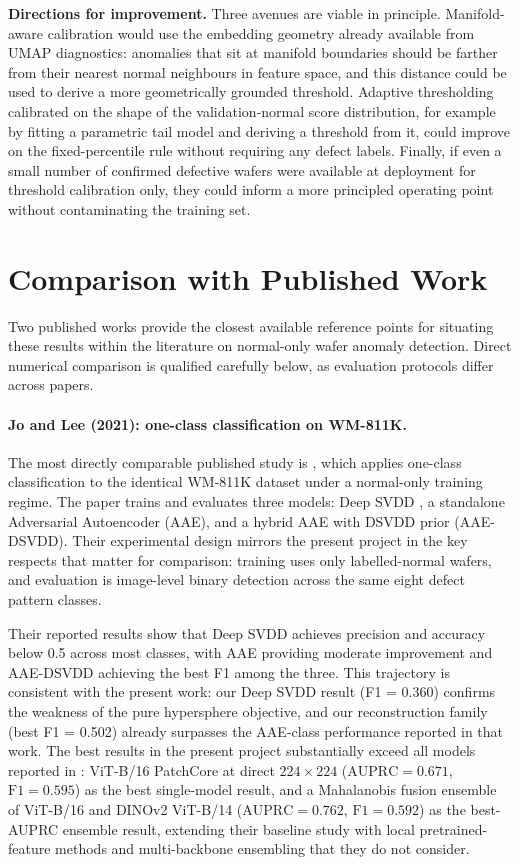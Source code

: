 \documentclass[11pt]{article}
\begin{document}
\textbf{Directions for improvement.} Three avenues are viable in principle. Manifold-aware calibration would use the embedding geometry already available from UMAP diagnostics: anomalies that sit at manifold boundaries should be farther from their nearest normal neighbours in feature space, and this distance could be used to derive a more geometrically grounded threshold. Adaptive thresholding calibrated on the shape of the validation-normal score distribution, for example by fitting a parametric tail model and deriving a threshold from it, could improve on the fixed-percentile rule without requiring any defect labels. Finally, if even a small number of confirmed defective wafers were available at deployment for threshold calibration only, they could inform a more principled operating point without contaminating the training set.

\section{Comparison with Published Work}

Two published works provide the closest available reference points for
situating these results within the literature on normal-only wafer anomaly
detection. Direct numerical comparison is qualified carefully below, as
evaluation protocols differ across papers.

\paragraph{Jo and Lee (2021): one-class classification on WM-811K.}
The most directly comparable published study is \cite{jo2021oneclass},
which applies one-class classification to the identical WM-811K dataset
under a normal-only training regime. The paper trains and evaluates three
models: Deep SVDD \cite{ruff2018deepsvdd}, a standalone Adversarial
Autoencoder (AAE), and a hybrid AAE with DSVDD prior (AAE-DSVDD). Their
experimental design mirrors the present project in the key respects that
matter for comparison: training uses only labelled-normal wafers, and
evaluation is image-level binary detection across the same eight defect
pattern classes.

Their reported results show that Deep SVDD achieves precision and accuracy
below 0.5 across most classes, with AAE providing moderate improvement and
AAE-DSVDD achieving the best F1 among the three. This trajectory is
consistent with the present work: our Deep SVDD result (F1 = 0.360)
confirms the weakness of the pure hypersphere objective, and our
reconstruction family (best F1 = 0.502) already surpasses the AAE-class
performance reported in that work. The best results in the present project substantially exceed all models reported in
\cite{jo2021oneclass}: ViT-B/16 PatchCore at direct $224\!\times\!224$ ($\mathrm{AUPRC}=0.671$, $\mathrm{F1}=0.595$)
as the best single-model result, and a Mahalanobis fusion ensemble of ViT-B/16
and DINOv2 ViT-B/14 ($\mathrm{AUPRC}=0.762$, $\mathrm{F1}=0.592$) as the best-AUPRC ensemble result,
extending their baseline study with local pretrained-feature methods and multi-backbone ensembling that
they do not consider.
\end{document}
